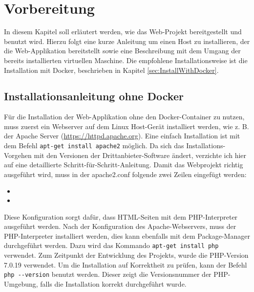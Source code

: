 \chapter{Vorbereitung}
In diesem Kapitel soll erläutert werden, wie das Web-Projekt bereitgestellt und benutzt wird. Hierzu folgt eine kurze Anleitung um einen Host zu installieren, der die Web-Applikation bereitstellt sowie eine Beschreibung mit dem Umgang der bereits installierten virtuellen Maschine. Die empfohlene Installationsweise ist die Installation mit Docker, beschrieben in Kapitel \ref{sec:InstallWithDocker}. 

\section{Installationsanleitung ohne Docker}
\label{sec:Install}

Für die Installation der Web-Applikation ohne den Docker-Container zu nutzen, muss zuerst ein Webserver auf dem Linux Host-Gerät installiert werden, wie z. B. der Apache Server (\url{https://httpd.apache.org}). Eine einfach Installation ist mit dem Befehl \colorbox{altgray}{\lstinline|apt-get install apache2|} möglich. Da sich das Installations-Vorgehen mit den Versionen der Drittanbieter-Software ändert, verzichte ich hier auf eine detaillierte Schritt-für-Schritt-Anleitung. Damit das Webprojekt richtig ausgeführt wird, muss in der apache2.conf folgende zwei Zeilen eingefügt werden:\medskip

\begin{itemize}
	\item {}
	\item {}\medskip
\end{itemize}
	
Diese Konfiguration sorgt dafür, dass HTML-Seiten mit dem PHP-Interpreter ausgeführt werden. Nach der Konfiguration des Apache-Webservers, muss der PHP-Interpreter installiert werden, dies kann ebenfalls mit dem Package-Manager durchgeführt werden. Dazu wird das Kommando \colorbox{altgray}{\lstinline|apt-get install php|} verwendet. Zum Zeitpunkt der Entwicklung des Projekts, wurde die PHP-Version 7.0.19 verwendet. Um die Installation auf Korrektheit zu prüfen, kann der Befehl \colorbox{altgray}{\lstinline|php --version|} benutzt werden. Dieser zeigt die Versionsnummer der PHP-Umgebung, falls die Installation korrekt durchgeführt wurde.\medskip

